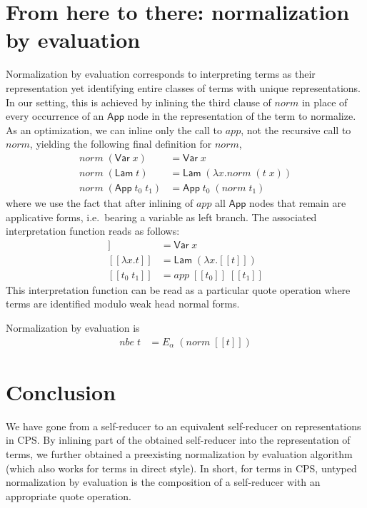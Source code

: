 \documentclass[a4paper]{amsart}
\newcommand{\Var}{\mathsf{Var}\;}
\newcommand{\Lam}{\mathsf{Lam}\;}
\newcommand{\App}{\mathsf{App}\;}
\newcommand{\interp}[1]{[\![#1]\!]}
\begin{document}
\section{From here to there: normalization by evaluation}

Normalization by evaluation corresponds to interpreting terms as their
representation yet identifying entire classes of terms with unique
representations. In our setting, this is achieved by inlining the third clause
of $norm$ in place of every occurrence of an $\mathsf{App}$ node in the
representation of the term to normalize. As an optimization, we can inline
only the call to $app$, not the recursive call to $norm$, yielding the
following final definition for $norm$,
\begin{align*}
  norm\;(\Var x) &= \Var x \\
  norm\;(\Lam t) &= \Lam (\lambda x. norm\;(t\;x)) \\
  norm\;(\App t_0\;t_1) &= \App t_0\;(norm\;t_1)
\end{align*}
where we use the fact that after inlining of $app$ all $\mathsf{App}$ nodes
that remain are applicative forms, i.e.\ bearing a variable as left branch.
The associated interpretation function reads as follows:
\begin{align*}
\interp{x} &= \Var x \\
\interp{\lambda x. t} &= \Lam (\lambda x. \interp t) \\
\interp{t_0\;t_1} &= app\;\interp{t_0}\;\interp{t_1}
\end{align*}
This interpretation function can be read as a particular quote operation where
terms are identified modulo weak head normal forms.

Normalization by evaluation is
\begin{align*}
  nbe\;t &= E_\alpha\;(norm\;\interp{t})
\end{align*}

\section{Conclusion}

We have gone from a self-reducer to an equivalent self-reducer on
representations in CPS. By inlining part of the obtained self-reducer into the
representation of terms, we further obtained a preexisting normalization by
evaluation algorithm (which also works for terms in direct style). In short,
for terms in CPS, untyped normalization by evaluation is the composition of a
self-reducer with an appropriate quote operation.
\end{document}
